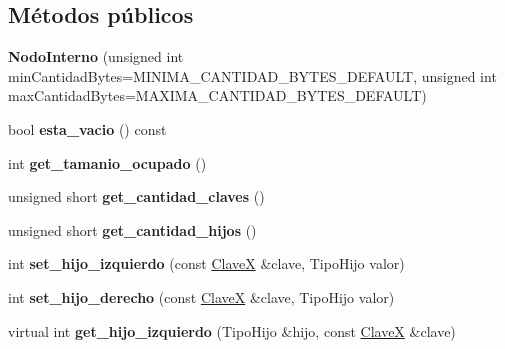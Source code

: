 \subsection*{\-Métodos públicos}
\begin{DoxyCompactItemize}
\item 
\hypertarget{class_nodo_interno_adeb0e2b45aa8c0360877bc4db98c1980}{{\bfseries \-Nodo\-Interno} (unsigned int min\-Cantidad\-Bytes=\-M\-I\-N\-I\-M\-A\-\_\-\-C\-A\-N\-T\-I\-D\-A\-D\-\_\-\-B\-Y\-T\-E\-S\-\_\-\-D\-E\-F\-A\-U\-L\-T, unsigned int max\-Cantidad\-Bytes=\-M\-A\-X\-I\-M\-A\-\_\-\-C\-A\-N\-T\-I\-D\-A\-D\-\_\-\-B\-Y\-T\-E\-S\-\_\-\-D\-E\-F\-A\-U\-L\-T)}\label{class_nodo_interno_adeb0e2b45aa8c0360877bc4db98c1980}

\item 
\hypertarget{class_nodo_interno_ae0dfe3150aa4231e6ea3e361f9d2b377}{bool {\bfseries esta\-\_\-vacio} () const }\label{class_nodo_interno_ae0dfe3150aa4231e6ea3e361f9d2b377}

\item 
\hypertarget{class_nodo_interno_afd601d62c9edeec9deefbaa5f50cdea9}{int {\bfseries get\-\_\-tamanio\-\_\-ocupado} ()}\label{class_nodo_interno_afd601d62c9edeec9deefbaa5f50cdea9}

\item 
\hypertarget{class_nodo_interno_ae11a53f4a17bc51218f975606c19f303}{unsigned short {\bfseries get\-\_\-cantidad\-\_\-claves} ()}\label{class_nodo_interno_ae11a53f4a17bc51218f975606c19f303}

\item 
\hypertarget{class_nodo_interno_ae7767989acab35c50a899458b9137492}{unsigned short {\bfseries get\-\_\-cantidad\-\_\-hijos} ()}\label{class_nodo_interno_ae7767989acab35c50a899458b9137492}

\item 
\hypertarget{class_nodo_interno_a4ae880d12dcfbba0be738b6eb95ae340}{int {\bfseries set\-\_\-hijo\-\_\-izquierdo} (const \hyperlink{class_clave_x}{\-Clave\-X} \&clave, \-Tipo\-Hijo valor)}\label{class_nodo_interno_a4ae880d12dcfbba0be738b6eb95ae340}

\item 
\hypertarget{class_nodo_interno_a57adb7610f0572173253b31504337899}{int {\bfseries set\-\_\-hijo\-\_\-derecho} (const \hyperlink{class_clave_x}{\-Clave\-X} \&clave, \-Tipo\-Hijo valor)}\label{class_nodo_interno_a57adb7610f0572173253b31504337899}

\item 
\hypertarget{class_nodo_interno_ac63656665c6c25fad23a1af53acb9868}{virtual int {\bfseries get\-\_\-hijo\-\_\-izquierdo} (\-Tipo\-Hijo \&hijo, const \hyperlink{class_clave_x}{\-Clave\-X} \&clave)}\label{class_nodo_interno_ac63656665c6c25fad23a1af53acb9868}


\end{DoxyCompactItemize}
